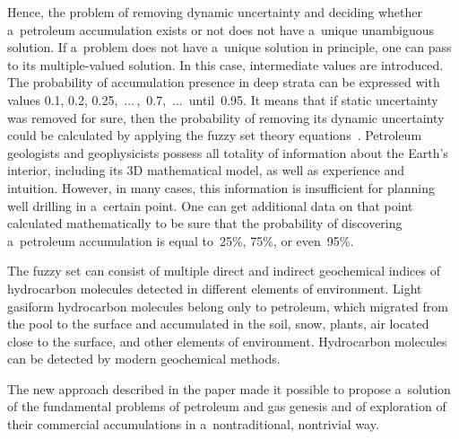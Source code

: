 \begin{multicols}{2}
     Hence, the problem of removing dynamic uncertainty and deciding whether 
a~petroleum accumulation exists or not does not have a~unique unambiguous 
solution. If a~problem does not have a~unique solution in principle, one can pass to 
its multiple-valued solution. In this case, intermediate values are introduced. The 
probability of accumulation presence in deep strata can be expressed with values 
0.1, 0.2, 0.25,\ $\ldots$\,,\ 0.7,\ $\ldots$\ until~0.95. It means that if static uncertainty was 
removed for sure, then the probability of removing its dynamic uncertainty could 
be calculated by applying the fuzzy set theory equations~\cite{15-seif}. Petroleum 
geologists and geophysicists possess all totality of information about the Earth's 
interior, including its 3D mathematical model, as well as experience and intuition. 
However, in many cases, this information is insufficient for planning well drilling 
in a~certain point. One can get additional data on that point calculated 
mathematically to be sure that the probability of discovering a~petroleum 
accumulation is equal to~25\%, 75\%, or even~95\%.
     
     The fuzzy set can consist of multiple direct and indirect geochemical indices 
of hydrocarbon molecules detected in different elements of environment. Light 
gasiform hydrocarbon molecules belong only to petroleum, which migrated from 
the pool to the surface and accumulated in the soil, snow, plants, air located close 
to the surface, and other elements of environment. Hydrocarbon molecules can be 
detected by modern geochemical methods.
     
     The new approach described in the 
paper made it possible to propose a~solution of the fundamental problems of 
petroleum and gas genesis and of exploration of their commercial accumulations in 
a~nontraditional, nontrivial way. 
    
\renewcommand{\bibname}{\protect\rmfamily References}


{\small\frenchspacing
{%
\begin{thebibliography}{99}


\end{thebibliography}}}
\end{multicols}
